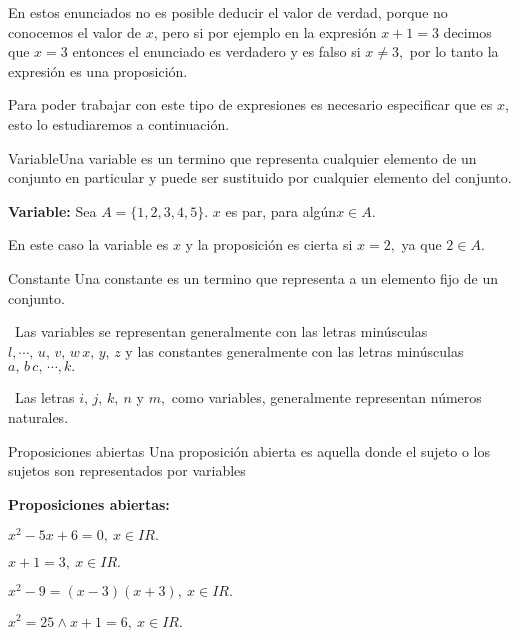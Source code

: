 En estos enunciados no es posible deducir el valor de verdad, porque
no conocemos el valor de $x$, pero si por ejemplo en la expresión
$x+1=3$ decimos que $x=3$ entonces el enunciado es verdadero y es
falso si $x\neq3,$ por lo tanto la expresión es una proposición.

Para poder trabajar con este tipo de expresiones es necesario especificar
que es $x$, esto lo estudiaremos a continuación.

\begin{defi}{Variable}{}Una variable es un termino que representa
cualquier elemento de un conjunto en particular y puede ser sustituido
por cualquier elemento del conjunto.\end{defi}

\begin{ejemplo}{\bf Variable:}\;  Sea $A=\{1,2,3,4,5\}$. $x$
es par, para algún$x\in A$.

En este caso la variable es $x$ y la proposición es cierta si $x=2,$
ya que $2\in A.$\end{ejemplo}

\begin{defi}{Constante}{} Una constante es un termino que representa
a un elemento fijo de un conjunto. \end{defi}

\notacion\ Las variables se representan generalmente con las letras
minúsculas $l,\cdots,\,u,\,v,\,w\,x,\,y,\,z$ y las constantes generalmente
con las letras minúsculas $a,\,b\,c,\,\cdots,k.$

\obs\ Las letras $i,\,j,\,k,\:n$ y $m,$ como variables, generalmente
representan números naturales.

\begin{defi}{Proposiciones abiertas}{} Una proposición abierta es
aquella donde el sujeto o los sujetos son representados por variables\end{defi}

\begin{ejemplo}{\bf Proposiciones abiertas:}

\begin{lista}\label{ejem1}

\item $x^{2}-5x+6=0,\:x\in I\!\!R.$

\item $x+1=3,\:x\in I\!\!R.$

\item $x^{2}-9=\left(x-3\right)\left(x+3\right),\:x\in I\!\!R.$

\item $x^{2}=25\wedge x+1=6,\:x\in I\!\!R.$

\end{lista}

\end{ejemplo}


